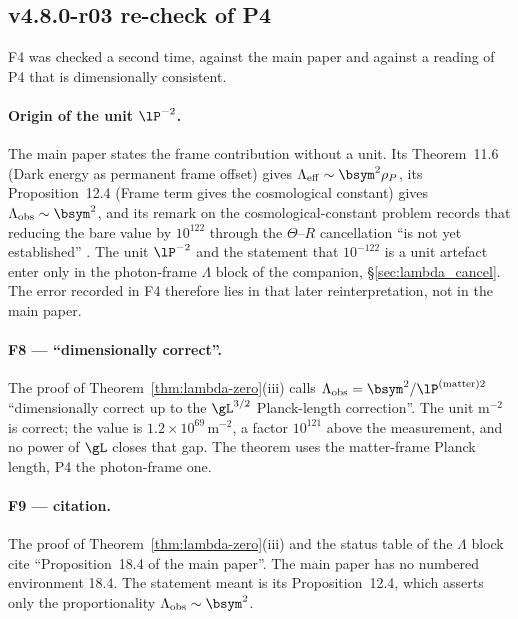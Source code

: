 \subsection*{v4.8.0-r03 re-check of P4}
\label{subsec:v480-r03-p4-recheck}

F4 was checked a second time, against the main paper and against a reading of P4 that is
dimensionally consistent.

\paragraph{Origin of the unit \(\lP^{-2}\).}
The main paper states the frame contribution without a unit.  Its Theorem~11.6 (Dark energy as
permanent frame offset) gives \(\Lambda_{\mathrm{eff}}\sim\bsym^2\rho_P\), its Proposition~12.4
(Frame term gives the cosmological constant) gives \(\Lambda_{\mathrm{obs}}\sim\bsym^2\), and its
remark on the cosmological-constant problem records that reducing the bare value by
\(10^{122}\) through the \(\Theta\)--\(R\) cancellation ``is not yet established''
\cite{brendecke2026main}.  The unit \(\lP^{-2}\) and the statement that \(10^{-122}\) is a unit
artefact enter only in the photon-frame \(\Lambda\) block of the companion,
\S\ref{sec:lambda_cancel}.  The error recorded in F4 therefore lies in that later
reinterpretation, not in the main paper.

\paragraph{F8 --- ``dimensionally correct''.}
The proof of Theorem~\ref{thm:lambda-zero}(iii) calls \(\Lambda_{\mathrm{obs}}=\bsym^2/\lP^{(\mathrm{matter})2}\)
``dimensionally correct up to the \(\gL^{3/2}\) Planck-length correction''.  The unit
\(\mathrm{m}^{-2}\) is correct; the value is \(1.2\times10^{69}\,\mathrm{m}^{-2}\), a factor
\(10^{121}\) above the measurement, and no power of \(\gL\) closes that gap.  The theorem uses the
matter-frame Planck length, P4 the photon-frame one.

\paragraph{F9 --- citation.}
The proof of Theorem~\ref{thm:lambda-zero}(iii) and the status table of the \(\Lambda\) block cite
``Proposition~18.4 of the main paper''.  The main paper has no numbered environment 18.4.  The
statement meant is its Proposition~12.4, which asserts only the proportionality
\(\Lambda_{\mathrm{obs}}\sim\bsym^2\).

